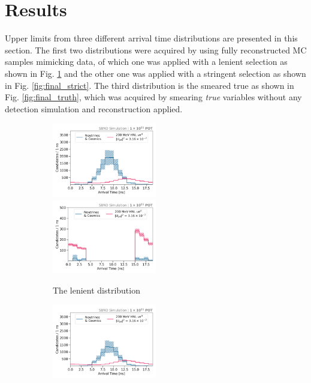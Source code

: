 \section{Results}
\label{sec:result}

Upper limits from three different arrival time distributions are presented in this section.
The first two distributions were acquired by using fully reconstructed MC samples mimicking data, of which one was applied with a lenient selection as shown in Fig. \ref{fig:final_relaxed} and the other one was applied with a stringent selection as shown in Fig. \ref{fig:final_strict}.
The third distribution is the smeared true as shown in Fig. \ref{fig:final_truth}, which was acquired by smearing \textit{true} variables without any detection simulation and reconstruction applied.
\begin{figure}[htbp!]
        \begin{subfigure}[b]{1.0\textwidth}
            \includegraphics[width=0.5\textwidth]{relaxed_cut}
            \includegraphics[width=0.5\textwidth]{relaxed_cut_edge}
            \caption{The lenient distribution}%
	    \label{fig:final_relaxed}
     	    \vspace{0.5cm}
        \end{subfigure}
        \begin{subfigure}[b]{1.0\textwidth}
            \includegraphics[width=0.5\textwidth]{strict_cut}

\end{subfigure}
\end{figure}

